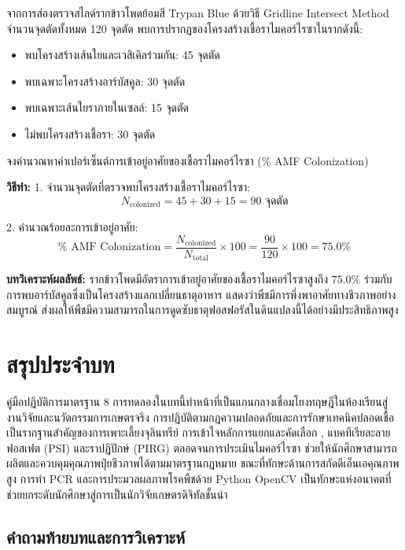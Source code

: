 \begin{worked}
จากการส่องตรวจสไลด์รากข้าวโพดย้อมสี Trypan Blue ด้วยวิธี Gridline Intersect Method จำนวนจุดตัดทั้งหมด 120 จุดตัด พบการปรากฏของโครงสร้างเชื้อราไมคอร์ไรซาในรากดังนี้:
\begin{itemize}
    \item พบโครงสร้างเส้นใยและเวสิเคิลร่วมกัน: 45 จุดตัด
    \item พบเฉพาะโครงสร้างอาร์บัสคูล: 30 จุดตัด
    \item พบเฉพาะเส้นใยราภายในเซลล์: 15 จุดตัด
    \item ไม่พบโครงสร้างเชื้อรา: 30 จุดตัด
\end{itemize}
จงคำนวณหาค่าเปอร์เซ็นต์การเข้าอยู่อาศัยของเชื้อราไมคอร์ไรซา (\% AMF Colonization)

\textbf{วิธีทำ:}
1. จำนวนจุดตัดที่ตรวจพบโครงสร้างเชื้อราไมคอร์ไรซา:
$$N_{\text{colonized}} = 45 + 30 + 15 = 90\text{ จุดตัด}$$

2. คำนวณร้อยละการเข้าอยู่อาศัย:
$$\% \text{ AMF Colonization} = \frac{N_{\text{colonized}}}{N_{\text{total}}} \times 100 = \frac{90}{120} \times 100 = \mathbf{75.0\%}$$

\textbf{บทวิเคราะห์ผลลัพธ์:} รากข้าวโพดมีอัตราการเข้าอยู่อาศัยของเชื้อราไมคอร์ไรซาสูงถึง $75.0\%$ ร่วมกับการพบอาร์บัสคูลซึ่งเป็นโครงสร้างแลกเปลี่ยนธาตุอาหาร แสดงว่าพืชมีการพึ่งพาอาศัยทางชีวภาพอย่างสมบูรณ์ ส่งผลให้พืชมีความสามารถในการดูดซับธาตุฟอสฟอรัสในดินแปลงนี้ได้อย่างมีประสิทธิภาพสูง
\end{worked}

\section*{สรุปประจำบท}

คู่มือปฏิบัติการมาตรฐาน 8 การทดลองในบทนี้ทำหน้าที่เป็นแกนกลางเชื่อมโยงทฤษฎีในห้องเรียนสู่งานวิจัยและนวัตกรรมการเกษตรจริง การปฏิบัติตามกฎความปลอดภัยและการรักษาเทคนิคปลอดเชื้อเป็นรากฐานสำคัญของการเพาะเลี้ยงจุลินทรีย์ การเข้าใจหลักการแยกและคัดเลือก , แบคทีเรียละลายฟอสเฟต (PSI) และราปฏิปักษ์  (PIRG) ตลอดจนการประเมินไมคอร์ไรซา ช่วยให้นักศึกษาสามารถผลิตและควบคุมคุณภาพปุ๋ยชีวภาพได้ตามมาตรฐานกฎหมาย ขณะที่ทักษะด้านการสกัดดีเอ็นเอคุณภาพสูง การทำ PCR และการประมวลผลภาพโรคพืชด้วย Python OpenCV เป็นทักษะแห่งอนาคตที่ช่วยยกระดับนักศึกษาสู่การเป็นนักวิจัยเกษตรดิจิทัลชั้นนำ

\subsection*{คำถามท้ายบทและการวิเคราะห์}

